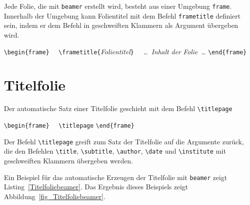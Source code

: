 \documentclass[a4paper,10pt,twoside]{scrbook}
\begin{document}
{Jede Folie, die mit \verb|beamer| erstellt wird, besteht aus einer Umgebung \verb!frame!. Innerhalb der Umgebung kann Folientitel mit dem Befehl \verb|frametitle| definiert sein, indem er dem Befehl in geschweiften Klammern als Argument übergeben wird.


\begin{boxedminipage}{\textwidth}
\verb!\begin{frame}!\newline
\verb!  \frametitle{!\textsl{Folientitel}\verb!}! \newline
\verb!  !\textsl{\dots\ Inhalt der Folie\ \dots} \newline
\verb!\end{frame}!
\end{boxedminipage}


\section{Titelfolie}


Der automatische Satz einer Titelfolie geschieht mit dem Befehl \verb!\titlepage!

\begin{boxedminipage}{\textwidth}
\verb!\begin{frame}!\newline
\verb!  \titlepage! \newline
\verb!\end{frame}!
\end{boxedminipage}

Der Befehl \verb!\titlepage! greift zum Satz der Titelfolie auf die 
Argumente zurück, die den Befehlen
\verb|\title|, 
\verb|\subtitle|, 
\verb|\author|, 
\verb|\date| und
\verb|\institute| mit geschweiften Klammern übergeben werden.



Ein Beispiel für das automatische Erzeugen der Titelfolie mit \verb|beamer| zeigt Listing~\ref{Titelfoliebeamer}. Das Ergebnis dieses Beispiels zeigt Abbildung~\ref{fig_Titelfoliebeamer}.





}
\end{document}
